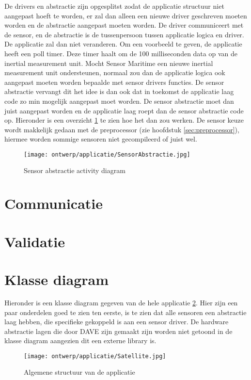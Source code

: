 \noindent De drivers en abstractie zijn opgesplitst zodat de applicatie structuur niet aangepast hoeft te worden, er zal dan alleen een nieuwe driver geschreven moeten worden en de abstractie aangepast moeten worden. De driver communiceert met de sensor, en de abstractie is de tussenpersoon tussen applicatie logica en driver. De applicatie zal dan niet veranderen. Om een voorbeeld te geven, de applicatie heeft een poll timer. Deze timer haalt om de 100 milliseconden data op van de inertial measurement unit. Mocht Sensor Maritime een nieuwe inertial measurement unit ondersteunen, normaal zou dan de applicatie logica ook aangepast moeten worden bepaalde met sensor drivers functies. De sensor abstractie vervangt dit het idee is dan ook dat in toekomst de applicatie laag code zo min mogelijk aangepast moet worden. De sensor abstractie moet dan juist aangepast worden en de applicatie laag roept dan de sensor abstractie code op. Hieronder is een overzicht \ref{fig:SensorAbstractie} te zien hoe het dan zou werken. De sensor keuze wordt makkelijk gedaan met de preprocessor (zie hoofdstuk \ref{sec:preprocessor}), hiermee worden sommige sensoren niet gecompileerd of juist wel.
\begin{figure}[h!]
	\centering
	\label{fig:SensorAbstractie}
	\caption{Sensor abstractie activity diagram}
	\texttt{[image: ontwerp/applicatie/SensorAbstractie.jpg]}
\end{figure}
	
	
\newpage
\section{Communicatie}

\newpage

\newpage
\section{Validatie}


\newpage
\section{Klasse diagram}
Hieronder is een klasse diagram gegeven van de hele applicatie \ref{fig:klassediagram}. Hier zijn een paar onderdelen goed te zien ten eerste, is te zien dat alle sensoren een abstractie laag hebben, die specifieke gekoppeld is aan een sensor  driver. De hardware abstractie lagen die door DAVE zijn gemaakt zijn worden niet getoond in de klasse diagram aangezien dit een externe library is.
\begin{figure}[h!]
	\centering
	\label{fig:klassediagram}
	\caption{Algemene structuur van de applicatie}
	\texttt{[image: ontwerp/applicatie/Satellite.jpg]}
\end{figure}
